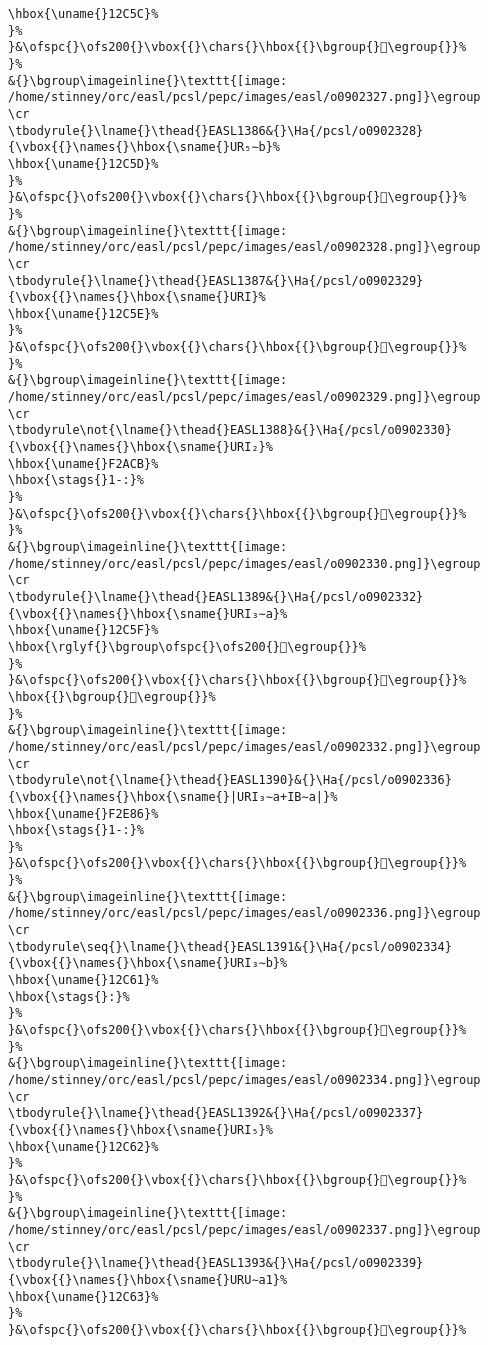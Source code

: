 \begin{verbatim}
\hbox{\uname{}12C5C}%
}%
}&\ofspc{}\ofs200{}\vbox{{}\chars{}\hbox{{}\bgroup{}𒱜\egroup{}}%
}%
&{}\bgroup\imageinline{}\texttt{[image: /home/stinney/orc/easl/pcsl/pepc/images/easl/o0902327.png]}\egroup
\cr
\tbodyrule{}\lname{}\thead{}EASL1386&{}\Ha{/pcsl/o0902328}{\vbox{{}\names{}\hbox{\sname{}UR₅∼b}%
\hbox{\uname{}12C5D}%
}%
}&\ofspc{}\ofs200{}\vbox{{}\chars{}\hbox{{}\bgroup{}𒱝\egroup{}}%
}%
&{}\bgroup\imageinline{}\texttt{[image: /home/stinney/orc/easl/pcsl/pepc/images/easl/o0902328.png]}\egroup
\cr
\tbodyrule{}\lname{}\thead{}EASL1387&{}\Ha{/pcsl/o0902329}{\vbox{{}\names{}\hbox{\sname{}URI}%
\hbox{\uname{}12C5E}%
}%
}&\ofspc{}\ofs200{}\vbox{{}\chars{}\hbox{{}\bgroup{}𒱞\egroup{}}%
}%
&{}\bgroup\imageinline{}\texttt{[image: /home/stinney/orc/easl/pcsl/pepc/images/easl/o0902329.png]}\egroup
\cr
\tbodyrule\not{\lname{}\thead{}EASL1388}&{}\Ha{/pcsl/o0902330}{\vbox{{}\names{}\hbox{\sname{}URI₂}%
\hbox{\uname{}F2ACB}%
\hbox{\stags{}1-:}%
}%
}&\ofspc{}\ofs200{}\vbox{{}\chars{}\hbox{{}\bgroup{}󲫋\egroup{}}%
}%
&{}\bgroup\imageinline{}\texttt{[image: /home/stinney/orc/easl/pcsl/pepc/images/easl/o0902330.png]}\egroup
\cr
\tbodyrule{}\lname{}\thead{}EASL1389&{}\Ha{/pcsl/o0902332}{\vbox{{}\names{}\hbox{\sname{}URI₃∼a}%
\hbox{\uname{}12C5F}%
\hbox{\rglyf{}\bgroup\ofspc{}\ofs200{}𒱟\egroup{}}%
}%
}&\ofspc{}\ofs200{}\vbox{{}\chars{}\hbox{{}\bgroup{}𒱟\egroup{}}%
\hbox{{}\bgroup{}𒱠\egroup{}}%
}%
&{}\bgroup\imageinline{}\texttt{[image: /home/stinney/orc/easl/pcsl/pepc/images/easl/o0902332.png]}\egroup
\cr
\tbodyrule\not{\lname{}\thead{}EASL1390}&{}\Ha{/pcsl/o0902336}{\vbox{{}\names{}\hbox{\sname{}|URI₃∼a+IB∼a|}%
\hbox{\uname{}F2E86}%
\hbox{\stags{}1-:}%
}%
}&\ofspc{}\ofs200{}\vbox{{}\chars{}\hbox{{}\bgroup{}󲺆\egroup{}}%
}%
&{}\bgroup\imageinline{}\texttt{[image: /home/stinney/orc/easl/pcsl/pepc/images/easl/o0902336.png]}\egroup
\cr
\tbodyrule\seq{}\lname{}\thead{}EASL1391&{}\Ha{/pcsl/o0902334}{\vbox{{}\names{}\hbox{\sname{}URI₃∼b}%
\hbox{\uname{}12C61}%
\hbox{\stags{}:}%
}%
}&\ofspc{}\ofs200{}\vbox{{}\chars{}\hbox{{}\bgroup{}𒱡\egroup{}}%
}%
&{}\bgroup\imageinline{}\texttt{[image: /home/stinney/orc/easl/pcsl/pepc/images/easl/o0902334.png]}\egroup
\cr
\tbodyrule{}\lname{}\thead{}EASL1392&{}\Ha{/pcsl/o0902337}{\vbox{{}\names{}\hbox{\sname{}URI₅}%
\hbox{\uname{}12C62}%
}%
}&\ofspc{}\ofs200{}\vbox{{}\chars{}\hbox{{}\bgroup{}𒱢\egroup{}}%
}%
&{}\bgroup\imageinline{}\texttt{[image: /home/stinney/orc/easl/pcsl/pepc/images/easl/o0902337.png]}\egroup
\cr
\tbodyrule{}\lname{}\thead{}EASL1393&{}\Ha{/pcsl/o0902339}{\vbox{{}\names{}\hbox{\sname{}URU∼a1}%
\hbox{\uname{}12C63}%
}%
}&\ofspc{}\ofs200{}\vbox{{}\chars{}\hbox{{}\bgroup{}𒱣\egroup{}}%

\end{verbatim}
